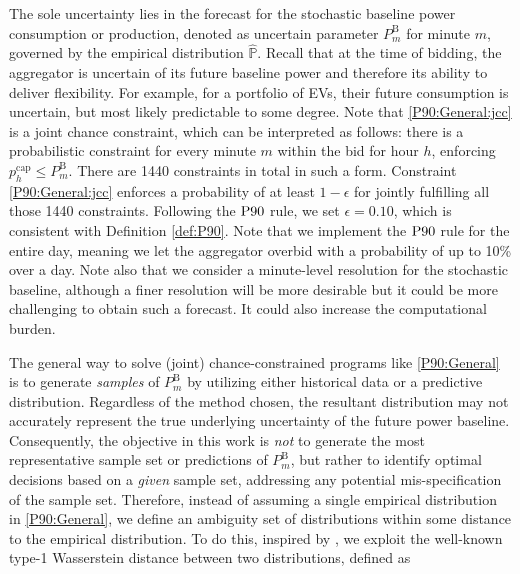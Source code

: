 \documentclass[conference]{IEEEtran}
\begin{document}
The sole uncertainty lies in the forecast for the stochastic baseline power consumption or production, denoted as uncertain parameter $P_{m}^{\text{B}}$ for minute $m$, governed by the empirical distribution $\hat{\mathbb{P}}$. Recall that at the time of bidding, the aggregator is uncertain of its future baseline power and therefore its ability to deliver flexibility. For example, for a portfolio of \acp{EV}, their future consumption is uncertain, but most likely predictable to some degree. Note that \eqref{P90:General:jcc} is a joint chance constraint, which can be interpreted as follows: there is a probabilistic constraint for every minute $m$ within the bid for hour $h$, enforcing $p_{h}^{\text{cap}} \leq P_{m}^{\text{B}}$. There are 1440 constraints in total in such a form. Constraint \eqref{P90:General:jcc} enforces a probability of at least $1-\epsilon$ for jointly fulfilling all those 1440 constraints. Following the $\rm{P90}$ rule, we set $\epsilon\!=\!0.10$, which is consistent with Definition \ref{def:P90}. Note that we implement the $\rm{P90}$ rule for the entire day, meaning we let the aggregator overbid with a probability of up to 10\% over a day. Note also that we consider a minute-level resolution for the stochastic baseline, although a finer resolution will be more desirable but it could be more challenging to obtain such a forecast. It could also increase the computational burden. 



The general way to solve (joint) chance-constrained programs like \eqref{P90:General} is to generate \textit{samples} of $P_{m}^{\text{B}}$ by utilizing either historical data or a predictive distribution. Regardless of the method chosen, the resultant distribution may not accurately represent the true underlying uncertainty of the future power baseline. Consequently, the objective in this work is \textit{not} to generate the most representative sample set or predictions of $P_{m}^{\text{B}}$, but rather to identify optimal decisions based on a \textit{given} sample set, addressing any potential mis-specification of the sample set.
%
Therefore, instead of assuming a single empirical distribution in \eqref{P90:General}, we define an ambiguity set of distributions within some distance to the empirical distribution. To do this, inspired by \cite{chen2022data}, we exploit the well-known type-1 Wasserstein distance between two distributions, defined as
\end{document}
